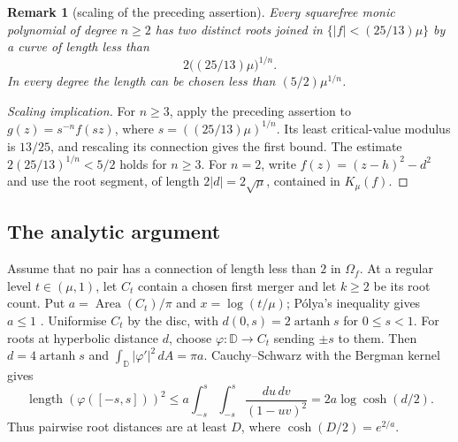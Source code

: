\documentclass[11pt]{article}
\newtheorem{remark}[theorem]{Remark}
\begin{document}
\begin{remark}[scaling of the preceding assertion]
\label{res:scaled-low-critical}
Every squarefree monic polynomial of degree $n\ge2$ has two distinct roots
joined in $\{|f|<(25/13)\mu\}$ by a curve of length less than
\[
 2\bigl((25/13)\mu\bigr)^{1/n}.
\]
In every degree the length can be chosen less than $(5/2)\mu^{1/n}$.
\end{remark}

\begin{proof}[Scaling implication]
For $n\ge3$, apply the preceding assertion to
$g(z)=s^{-n}f(sz)$, where $s=((25/13)\mu)^{1/n}$. Its least
critical-value modulus is $13/25$, and rescaling its connection gives
the first bound. The estimate $2(25/13)^{1/n}<5/2$ holds for $n\ge3$.
For $n=2$, write $f(z)=(z-h)^2-d^2$ and use the root segment, of length
$2|d|=2\sqrt\mu$, contained in $K_\mu(f)$.
\end{proof}

\subsection{The analytic argument}
Assume that no pair has a connection of length less than $2$ in
$\Omega_f$. At a regular level $t\in(\mu,1)$, let $C_t$ contain a
chosen first merger and let $k\ge2$ be its root count. Put
$a=\operatorname{Area}(C_t)/\pi$ and $x=\log(t/\mu)$; P\'olya's
inequality gives $a\le1$ \cite[Theorems~1 and~6]{crane}.
Uniformise $C_t$ by the disc, with $d(0,s)=2\operatorname{artanh}s$
for $0\le s<1$. For roots at hyperbolic distance $d$, choose
$\varphi:\mathbb D\to C_t$ sending $\pm s$ to them. Then
$d=4\operatorname{artanh}s$ and
$\int_{\mathbb D}|\varphi'|^2\,dA=\pi a$. Cauchy--Schwarz with the
Bergman kernel gives
\[
 \operatorname{length}(\varphi([-s,s]))^2
 \le a\int_{-s}^{s}\int_{-s}^{s}\frac{du\,dv}{(1-uv)^2}
 =2a\log\cosh(d/2).
\]
Thus pairwise root distances are at least $D$, where
$\cosh(D/2)=e^{2/a}$.
\end{document}
